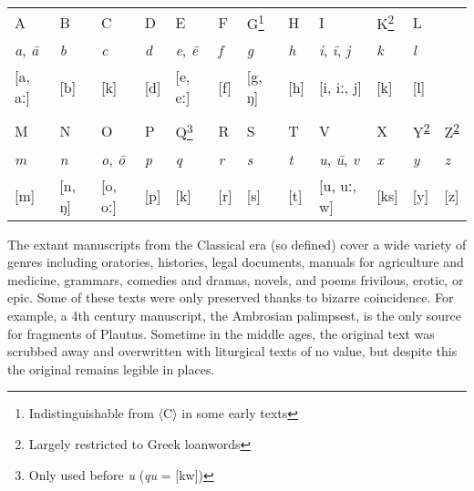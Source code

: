 \begin{example}
\begin{minipage}{\linewidth}
\centering
\begin{tabular}{C{10mm}@{ }C{10mm}@{ }C{10mm}@{ }C{10mm}@{ }C{10mm}@{ }C{10mm}@{ }C{10mm}@{ }C{10mm}@{ }C{15.5mm}@{ }C{10mm}@{ }C{10mm}@{ }C{5.5mm}}
A         & B        & C        & D        & E        & F        & G\footnote[1]{Indistinguishable from $\langle$C$\rangle$ in some early texts} & H        & I                  & K\footnote[2]{Largely restricted to Greek loanwords\label{marge}} & L        \\
\emph{a}, \emph{ā}  & \emph{b} & \emph{c} & \emph{d} & \emph{e}, \emph{ē} & \emph{f} & \emph{g} & \emph{h} & \emph{i}, \emph{ī}, \emph{j} & \emph{k} & \emph{l} \\
\pad{}[a, aː] & [b]      & [k]      & [d]      & [e, eː]      & [f]      & [g, ŋ]   & [h]      & [i, iː, j]             & [k]      & [l]      \\
\\
M         & N        & O        & P        & Q\footnote[3]{Only used before \emph{u} (\emph{qu} = [kw])} & R        & S        & T        & V                  & X        & Y\textsuperscript{\ref{marge}}        & Z\textsuperscript{\ref{marge}}        \\
\emph{m}  & \emph{n} & \emph{o}, \emph{ō} & \emph{p} & \emph{q} & \emph{r} & \emph{s} & \emph{t} & \emph{u}, \emph{ū}, \emph{v} & \emph{x} & \emph{y} & \emph{z} \\
\pad{}[m] & [n, ŋ]   & [o, oː]      & [p]      & [k]      & [r]      & [s]      & [t]      & [u, uː, w]             & [ks]     & [y]      & [z]      \\
\end{tabular}
\end{minipage}
\label{alphabet}
\end{example}

The extant manuscripts from the Classical era (so defined) cover a wide variety of genres including oratories, histories, legal documents, manuals for agriculture and medicine, grammars, comedies and dramas, novels, and poems frivilous, erotic, or epic.
Some of these texts were only preserved thanks to bizarre coincidence.
For example, a 4th century manuscript, the Ambrosian palimpsest, is the only source for fragments of Plautus.
Sometime in the middle ages, the original text was scrubbed away and overwritten with liturgical texts of no value, but despite this the original remains legible in places.

